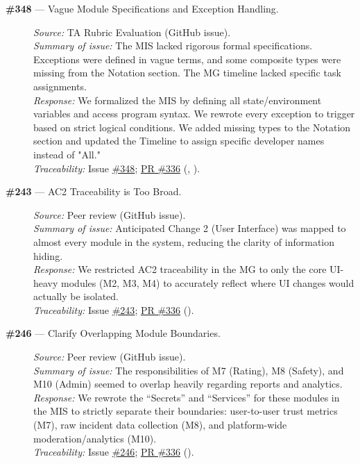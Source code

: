 \documentclass{article}
\begin{document}
\begin{description}
  \item[\textbf{\#348} --- Vague Module Specifications and Exception Handling.]
  \textit{Source:} TA Rubric Evaluation (GitHub issue). \\
  \textit{Summary of issue:} The MIS lacked rigorous formal specifications. Exceptions were defined in vague terms, and some composite types were missing from the Notation section. The MG timeline lacked specific task assignments. \\
  \textit{Response:} We formalized the MIS by defining all state/environment variables and access program syntax. We rewrote every exception to trigger based on strict logical conditions. We added missing types to the Notation section and updated the Timeline to assign specific developer names instead of "All." \\
  \textit{Traceability:} Issue \href{https://github.com/hitchly/hitchly/issues/348}{\#348}; \href{https://github.com/hitchly/hitchly/pull/336}{PR \#336} (, ).

  \item[\textbf{\#243} --- AC2 Traceability is Too Broad.]
  \textit{Source:} Peer review (GitHub issue). \\
  \textit{Summary of issue:} Anticipated Change 2 (User Interface) was mapped to almost every module in the system, reducing the clarity of information hiding. \\
  \textit{Response:} We restricted AC2 traceability in the MG to only the core UI-heavy modules (M2, M3, M4) to accurately reflect where UI changes would actually be isolated. \\
  \textit{Traceability:} Issue \href{https://github.com/hitchly/hitchly/issues/243}{\#243}; \href{https://github.com/hitchly/hitchly/pull/336}{PR \#336} ().

  \item[\textbf{\#246} --- Clarify Overlapping Module Boundaries.]
  \textit{Source:} Peer review (GitHub issue). \\
  \textit{Summary of issue:} The responsibilities of M7 (Rating), M8 (Safety), and M10 (Admin) seemed to overlap heavily regarding reports and analytics. \\
  \textit{Response:} We rewrote the ``Secrets'' and ``Services'' for these modules in the MIS to strictly separate their boundaries: user-to-user trust metrics (M7), raw incident data collection (M8), and platform-wide moderation/analytics (M10). \\
  \textit{Traceability:} Issue \href{https://github.com/hitchly/hitchly/issues/246}{\#246}; \href{https://github.com/hitchly/hitchly/pull/336}{PR \#336} ().
\end{description}
\end{document}
